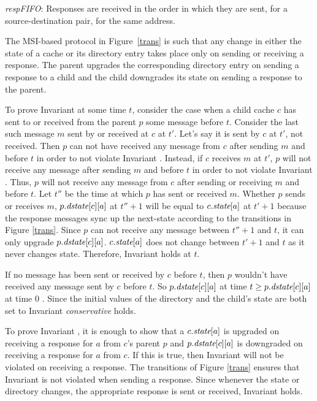 \begin{inv}
\textit{respFIFO}: Responses are received in the order in which they are sent,
for a source-destination pair, for the same address.
\label{respFIFO}
\end{inv}

The MSI-based protocol in Figure~\ref{trans} is such that any change in either
the state of a cache or its directory entry takes place only on sending or
receiving a response. The parent upgrades the corresponding directory entry on
sending a response to a child and the child downgrades its state on
sending a response to the parent.

To prove Invariant  at some time $t$, consider the case
when a child cache $c$ has sent to or received from the parent $p$ some message
before $t$. Consider the last such message $m$ sent by or received at $c$ at
$t'$. Let's say it is sent by $c$ at $t'$, not received. Then $p$ can not have
received any message from $c$ after sending $m$ and before $t$ in order to not
violate Invariant .  Instead, if $c$ receives $m$ at $t'$,
$p$ will not receive any message after sending $m$ and before $t$ in order to
not violate Invariant . Thus, $p$ will not receive any message
from $c$ after sending or receiving $m$ and before $t$.  Let $t''$ be the time
at which $p$ has sent or received $m$. Whether $p$ sends or receives $m$,
$p.\textit{dstate}[c][a]$ at $t''+1$ will be equal to $c.\textit{state}[a]$ at $t'+1$ because
the response messages sync up the next-state according to the transitions in
Figure \ref{trans}. Since $p$ can not receive any message between $t''+1$ and
$t$, it can only upgrade $p.\textit{dstate}[c][a]$. $c.\textit{state}[a]$ does not change
between $t'+1$ and $t$ as it never changes state. Therefore, Invariant
 holds at $t$.

If no message has been sent or received by $c$ before $t$, then $p$ wouldn't
have received any message sent by $c$ before $t$. So $p.\textit{dstate}[c][a]$ at time
$t \ge p.\textit{dstate}[c][a]$ at time $0$ . Since the initial values of the directory
and the child's state are both set to \In{} Invariant \textit{conservative}
holds.

To prove Invariant , it is enough to show that a
$c.\textit{state}[a]$ is upgraded on receiving a response for $a$ from $c$'s parent $p$
and $p.\textit{dstate}[c][a]$ is downgraded on receiving a response for $a$ from $c$.
If this is true, then Invariant  will not be
violated on receiving a response. The transitions of Figure \ref{trans} ensures
that Invariant  is not violated when sending a
response. Since whenever the state or directory changes, the appropriate
response is sent or received, Invariant  holds.


